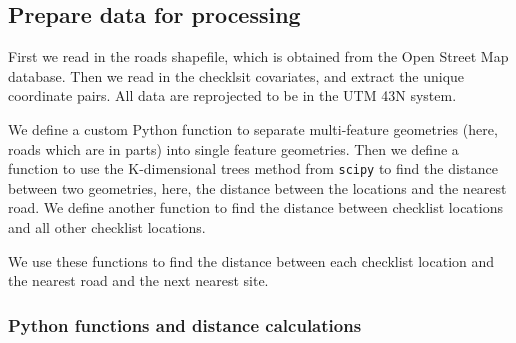 \documentclass[]{article}
\begin{document}
\hypertarget{prepare-data-for-processing}{%
\subsection{Prepare data for processing}\label{prepare-data-for-processing}}

First we read in the roads shapefile, which is obtained from the Open Street Map database.
Then we read in the checklsit covariates, and extract the unique coordinate pairs.
All data are reprojected to be in the UTM 43N system.

We define a custom Python function to separate multi-feature geometries (here, roads which are in parts) into single feature geometries.
Then we define a function to use the K-dimensional trees method from \texttt{scipy} to find the distance between two geometries, here, the distance between the locations and the nearest road.
We define another function to find the distance between checklist locations and all other checklist locations.

We use these functions to find the distance between each checklist location and the nearest road and the next nearest site.

\hypertarget{python-functions-and-distance-calculations}{%
\subsubsection{Python functions and distance calculations}\label{python-functions-and-distance-calculations}}
\end{document}
